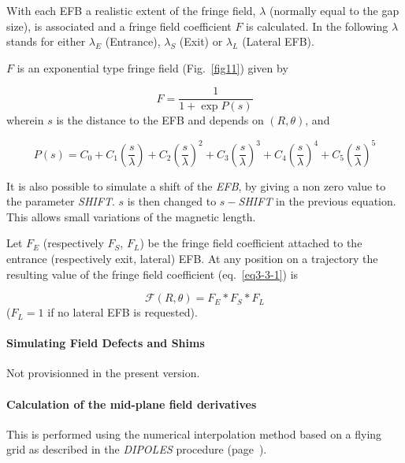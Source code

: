 \noindent With  each EFB a realistic extent of the fringe field, $\lambda$ 
(normally equal to the gap size), is associated and a fringe field coefficient
$ F $ is calculated. In the following $\lambda$ stands for either $ \lambda_ E $
(Entrance), $ \lambda_ S $ (Exit) or $ \lambda_ L $ (Lateral EFB).  


\bigskip

\noindent$ F $ is an exponential type fringe field (Fig.~\ref{fig11}) 
given by~\cite{Biblio12}     %

$$ F = \frac{1 }{ 1+ \exp P(s)} $$
%
 wherein $ s $ is the distance to the EFB and depends on $(R,\theta)$, and 

$$
    P(s) = C_0
       +C_1 \left(  \dfrac{s }{ \lambda} \right) 
       +C_2 \left( \dfrac{s }{ \lambda} \right)^2 
       + C_3 \left( \dfrac{s }{ \lambda} \right)^3 
       +C_4 \left( \dfrac{s }{ \lambda} \right)^4 
       + C_5 \left(\dfrac{s }{ \lambda} \right)^5 $$
       
\noindent It is also possible to simulate a shift of the \textsl{EFB}, by giving a non
zero value to the parameter \textsl{SHIFT}.  $ s $ is then changed to $ s -$\textsl{SHIFT} in the 
previous equation.   This allows small variations of the magnetic length.  
\bigskip

\noindent Let $ F_E $ (respectively $ F_S$, $F_L$)  be the fringe field
coefficient attached to the entrance (respectively exit, lateral) EFB. At any position on  a 
trajectory the resulting value of the fringe field coefficient (eq.~\ref{eq3-3-1}) is

$$  \mathcal{F}(R,\theta) = F_E  \ast  F_S \ast   F_L $$
%
($F_L=1 $ if no lateral EFB is requested). 



\paragraph{Simulating Field Defects and Shims }

\noindent Not provisionned in the present version. 

\bigskip


\paragraph{Calculation of the  mid-plane field derivatives }

This is performed using the numerical interpolation method based on a flying grid as described in 
the \textsl{DIPOLES} procedure (page~\pageref{CalcMidPlaneFieldInterpol}). 

